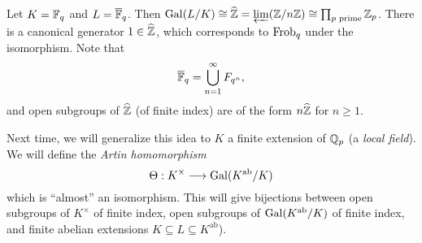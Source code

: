 \begin{example}
  Let $K = \mathbb{F}_q$ and $L = \overline{\mathbb{F}}_q$.
  Then $\operatorname{Gal}(L / K) \cong \widehat{\mathbb{Z}} = \varprojlim (\mathbb{Z} / n\mathbb{Z}) \cong \prod_{p \text{ prime}} \mathbb{Z}_p$.
  There is a canonical generator
  $1 \in \widehat{\mathbb{Z}}$, which corresponds to
  $\operatorname{Frob}_q$ under the isomorphism. Note that
  \[
    \overline{\mathbb{F}}_q = \bigcup_{n = 1}^\infty F_{q^n},
  \]
  and open subgroups of $\widehat{\mathbb{Z}}$ (of
  finite index) are of the form
  $n\widehat{\mathbb{Z}}$ for $n \ge 1$.
\end{example}

\begin{remark}
  Next time, we will generalize this
  idea to $K$
  a finite extension of $\mathbb{Q}_p$ (a \emph{local field}).
  We will define the
  \emph{Artin homomorphism}
  \[
    \Theta : K^\times \longrightarrow \operatorname{Gal}(K^{\mathrm{ab}} / K)
  \]
  which is ``almost'' an isomorphism.
  This will give bijections between
  open subgroups of $K^\times$ of finite index,
  open subgroups of $\operatorname{Gal}(K^{\mathrm{ab}} / K)$
  of finite index, and finite abelian extensions
  $K \subseteq L \subseteq K^{\mathrm{ab}}$).
\end{remark}
